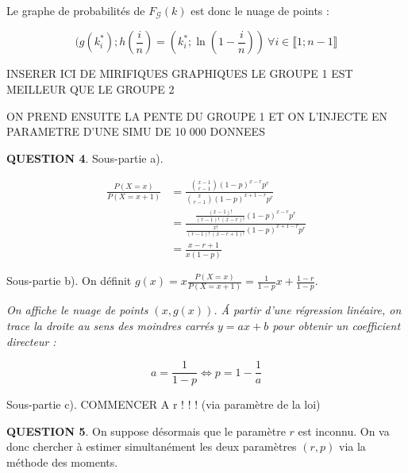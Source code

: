 \documentclass[a4paper,11pt]{article}
\newcommand{\quest}[1]{\small\textbf{#1}\normalsize}
\theoremstyle{nonumberplain}
\theoremstyle{nonumberplain}
\theoremstyle{nonumberplain}
\begin{document}
        \medskip
        Le graphe de probabilités de $F_\mathcal{G}(k)$ est donc le nuage de points :

          \[
              (g(k_i^*); h(\frac{i}{n}) = (k_i^*; \ln(1 - \frac{i}{n}))\ \forall i \in \llbracket 1; n - 1 \rrbracket
          \]

        INSERER ICI DE MIRIFIQUES GRAPHIQUES
        LE GROUPE 1 EST MEILLEUR QUE LE GROUPE 2

        ON PREND ENSUITE LA PENTE DU GROUPE 1
        ET ON L'INJECTE EN PARAMETRE D'UNE SIMU DE 10 000 DONNEES


      \quest{QUESTION 4}. Sous-partie a).
      \begin{calculs}
          \vspace{-2ex}
          \begin{equation*}
          \begin{split}
              \frac{P(X = x)}{P(X = x + 1)} & = \frac{\binom{x - 1}{r - 1} (1 - p)^{x - r}p^r}{\binom{x}{r - 1} (1 - p)^{x + 1 - r}p^r} \\
                                            & = \frac{\frac{(x - 1)!}{(r - 1)!\ (x - r)!} (1 - p)^{x - r}p^r}{\frac{x!}{(r - 1)!\ (x - r + 1)!} (1 - p)^{x + 1 - r}p^r} \\
                                            & = \frac{x - r + 1}{x (1 - p)}
          \end{split}
          \end{equation*}
      \end{calculs}

      Sous-partie b). On définit $g(x) = x \frac{P(X = x)}{P(X = x + 1)} = \frac{1}{1 - p}x + \frac{1 - r}{1 - p}$.
      \begin{calculs}
          \emph{On affiche le nuage de points $(x, g(x))$. \'{A} partir d'une régression linéaire, on trace
          la droite au sens des moindres carrés $y = ax + b$ pour obtenir un coefficient directeur :}

            \[
                a = \frac{1}{1 - p} \iff p = 1 - \frac{1}{a}
            \]
      \end{calculs}

      Sous-partie c). COMMENCER A r ! ! ! (via paramètre de la loi)

      \quest{QUESTION 5}. On suppose désormais que le paramètre $r$ est inconnu.
      On va donc chercher à estimer simultanément les deux paramètres $(r, p)$ via la méthode des moments.
\end{document}
